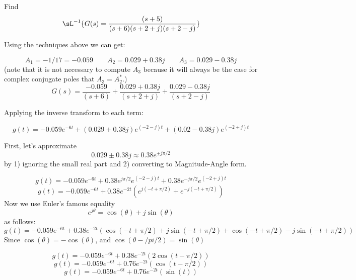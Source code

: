 \begin{Example}


Find
\[
\sL^{-1}\{G(s) = \frac{(s+5)}{(s+6)(s+2+j)(s+2-j)}\}
\]

\vspace{0.25in}

Using the techniques above we can get:

\[
A_1 = -1/17 = -0.059 \qquad A_2 = 0.029+0.38j \qquad A_3 = 0.029-0.38j
\]
(note that it is not necessary to compute $A_3$ because it will always be the case for complex conjugate poles that $A_3 = A_2^*$.)
\[
G(s)  = \frac {-0.059} {(s+6)}  + \frac {0.029+0.38j} {(s+2+j)}  + \frac {0.029-0.38j} {(s+2-j)}
\]

Applying the inverse transform to each term:

\[
g(t) = -0.059e^{-6t} + (0.029+0.38j)e^{(-2-j)t}+ (0.02-0.38j)e^{(-2+j)t}
\]

First, let's approximate
\[
0.029\pm 0.38j \approx 0.38e^{\pm j \pi/2}
\]
by 1) ignoring the small real part and 2) converting to Magnitude-Angle form.

\[
g(t) = -0.059e^{-6t} + 0.38e^{j\pi/2}e^{(-2-j)t} + 0.38e^{-j\pi/2}e^{(-2+j)t}
\]
\[
g(t) = -0.059e^{-6t} + 0.38e^{-2t} \left ( e^{j(-t+\pi/2)}+e^{-j(-t+\pi/2)} \right )
\]
Now we use Euler's famous equality
\[
e^{j\theta} = \cos(\theta) + j \sin(\theta)
\]
as follows:
\[
g(t) = -0.059e^{-6t} + 0.38e^{-2t} \left (
    \cos(-t+\pi/2) + j\sin(-t+\pi/2)+
    \cos(-t+\pi/2) - j\sin(-t+\pi/2)
    \right )
\]
Since $\cos(\theta) = -\cos(\theta)$, and $\cos(\theta-/pi/2) = \sin(\theta)$

\[
g(t) = -0.059e^{-6t} + 0.38e^{-2t} \left (
    2\cos(t-\pi/2)
    \right )
\]
\[
g(t) = -0.059e^{-6t} + 0.76e^{-2t} \left (
    \cos(t-\pi/2)
    \right )
\]
\[
g(t) = -0.059e^{-6t} + 0.76e^{-2t} \left (  \sin(t)  \right )
\]

\end{Example}



